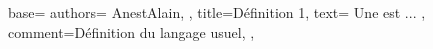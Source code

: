 {
  base={
    authors={
      AnestAlain,
    },
    title=Définition 1,
    text={
      Une  est ...
    },
    comment={Définition du langage usuel},
  },
}
